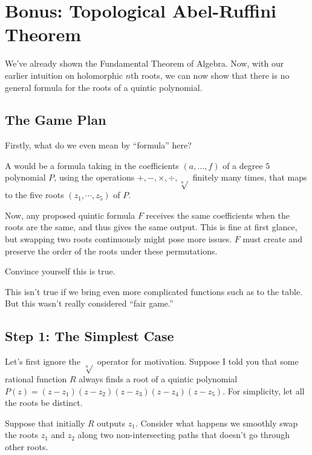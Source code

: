 \chapter{Bonus: Topological Abel-Ruffini Theorem}
We've already shown the Fundamental Theorem of Algebra.
Now, with our earlier intuition on holomorphic $n$th roots,
we can now show that there is no general formula for
the roots of a quintic polynomial.

\section{The Game Plan}
Firstly, what do we even mean by ``formula'' here?

\begin{definition}
	A  would be a formula taking in the coefficients $(a, \dots, f)$ of a
	degree $5$ polynomial $P$, using the operations $+, -, \times, \div, \sqrt[n]{}$
	finitely many times, that maps to the five roots $(z_1, \cdots, z_5)$ of $P$.
\end{definition}

Now, any proposed quintic formula $F$ receives the same coefficients when the roots are the same,
and thus gives the same output. This is fine at first glance, but swapping two roots continuously
might pose more issues. $F$ must create and preserve the order of the roots under these permutations.

\begin{ques}
	Convince yourself this is true.
\end{ques}

\begin{remark}
	This isn't true if we bring even more complicated functions
	such as  to the table.
	But this wasn't really considered ``fair game.''
\end{remark}

\section{Step 1: The Simplest Case}
Let's first ignore the $\sqrt[n]{}$ operator for motivation.
Suppose I told you that some rational function $R$ always finds
a root of a quintic polynomial $P(z) = (z - z_1)(z - z_2)(z - z_3)(z - z_4)(z - z_5)$.
For simplicity, let all the roots be distinct.

Suppose that initially $R$ outputs $z_1$. Consider what happens we smoothly swap the roots $z_1$ and $z_2$
along two non-intersecting paths that doesn't go through other roots.

